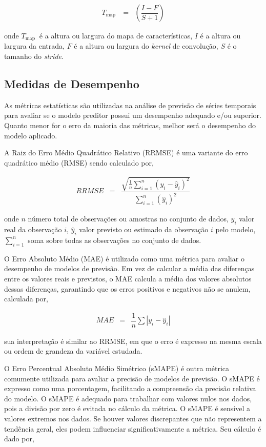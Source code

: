  \begin{eqnarray}
 	T_{\text {map }}&=&\left(\dfrac{I-F}{S+1}\right)\label{cnn1}
 \end{eqnarray}
 
 \noindent onde
 $T_{\text {map }}$ é a altura ou largura do mapa de características,
 $I$ é a altura ou largura da entrada,
 $F$ é a altura ou largura do \textit{kernel} de convolução,
 $S$ é o tamanho do \textit{stride}.
 
 \subsection{Medidas de Desempenho}\label{subsec:metrica}
 
As métricas estatísticas são utilizadas na análise de previsão de séries temporais para avaliar se o modelo preditor possui um desempenho adequado e/ou superior. Quanto menor for o erro da maioria das métricas, melhor será o desempenho do modelo aplicado.
 
A Raiz do Erro Médio Quadrático Relativo (RRMSE) é uma variante do erro quadrático médio (RMSE) sendo calculado por,
 
 \begin{eqnarray}
 	R R M S E&=&\dfrac{\sqrt{\frac{1}{n} \sum_{i=1}^n\left(y_i-\hat{y}_i\right)^2}}{\sum_{i=1}^n\left(\hat{y}_i\right)^2}
 \end{eqnarray}
 
 \noindent onde $n$ número total de observações ou amostras no conjunto de dados,
 $y_i$ valor real da observação $i$,
 $\hat{y}_i$ valor previsto ou estimado da observação $i$ pelo modelo,
 $\sum_{i=1}^{n}$ soma sobre todas as observações no conjunto de dados.
 
O Erro Absoluto Médio (MAE) é utilizado como uma métrica para avaliar o desempenho de modelos de previsão. Em vez de calcular a média das diferenças entre os valores reais e previstos, o MAE calcula a média dos valores absolutos dessas diferenças, garantindo que os erros positivos e negativos não se anulem, calculada por,
 
 \begin{eqnarray}
 	M A E &=& \dfrac{1}{n} \sum\left|y_i-\hat{y}_i\right|\label{eq:mae}
 \end{eqnarray}
 
 \noindent sua interpretação é similar ao RRMSE, em que o erro é expresso na mesma escala ou ordem de grandeza da variável estudada.
 
O Erro Percentual Absoluto Médio Simétrico (sMAPE) é outra métrica comumente utilizada para avaliar a precisão de modelos de previsão. O sMAPE é expresso como uma porcentagem, facilitando a compreensão da precisão relativa do modelo. O sMAPE é adequado para trabalhar com valores nulos nos dados, pois a divisão por zero é evitada no cálculo da métrica. O sMAPE é sensível a valores extremos nos dados. Se houver valores discrepantes que não representem a tendência geral, eles podem influenciar significativamente a métrica. Seu cálculo é dado por,
  

